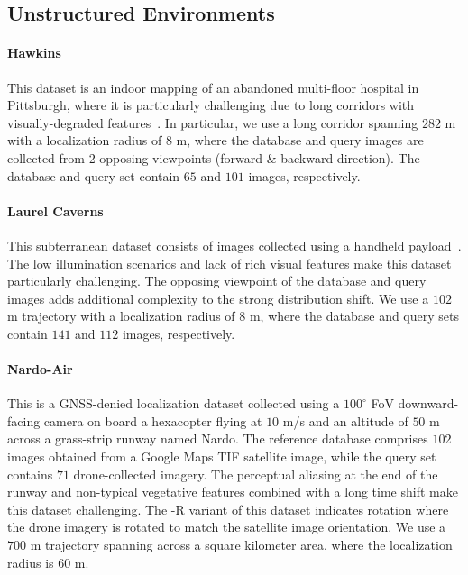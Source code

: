 \documentclass[letterpaper, 10 pt, conference]{ieeeconf}  \fi
\begin{document}
\subsection{Unstructured Environments}
\label{sec:appendix_unstructured}

\paragraph{Hawkins} This dataset is an indoor mapping of an abandoned multi-floor hospital in Pittsburgh, where it is particularly challenging due to long corridors with visually-degraded features~\cite{zhao2023subtmrs}. 
In particular, we use a long corridor spanning $282$ m with a localization radius of 8 m, where the database and query images are collected from 2 opposing viewpoints (forward \& backward direction). 
The database and query set contain $65$ and $101$ images, respectively.

\paragraph{Laurel Caverns} This subterranean dataset consists of images collected using a handheld payload~\cite{zhao2023subtmrs}. 
The low illumination scenarios and lack of rich visual features make this dataset particularly challenging. 
The opposing viewpoint of the database and query images adds additional complexity to the strong distribution shift.
We use a $102$ m trajectory with a localization radius of 8 m, where the database and query sets contain $141$ and $112$ images, respectively.

\paragraph{Nardo-Air} This is a GNSS-denied localization dataset collected using a $100^{\circ}$ FoV downward-facing camera on board a hexacopter flying at $10$ m/s and an altitude of $50$ m across a grass-strip runway named Nardo. The reference database comprises $102$ images obtained from a Google Maps TIF satellite image, while the query set contains $71$ drone-collected imagery. The perceptual aliasing at the end of the runway and non-typical vegetative features combined with a long time shift make this dataset challenging. The -R variant of this dataset indicates rotation where the drone imagery is rotated to match the satellite image orientation. We use a $700$ m trajectory spanning across a square kilometer area, where the localization radius is $60$ m.
\end{document}
